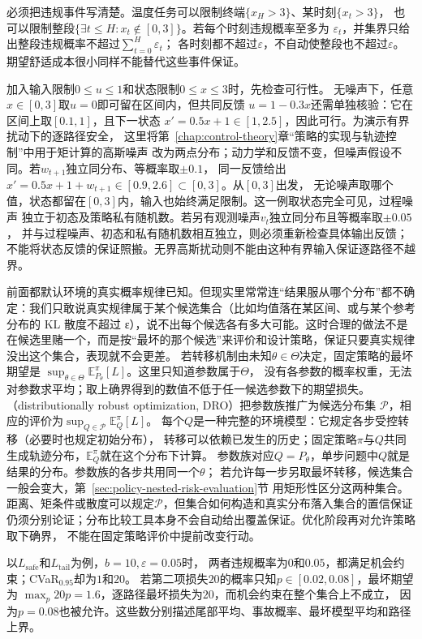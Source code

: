 必须把违规事件写清楚。温度任务可以限制终端$\{x_H>3\}$、某时刻$\{x_t>3\}$，
也可以限制整段$\{\exists t\leq H:x_t\notin[0,3]\}$。若每个时刻违规概率至多为
$\varepsilon_t$，并集界只给出整段违规概率不超过$\sum_{t=0}^H\varepsilon_t$；
各时刻都不超过$\varepsilon$，不自动使整段也不超过$\varepsilon$。
期望舒适成本很小同样不能替代这些事件保证。

加入输入限制$0\leq u\leq1$和状态限制$0\leq x\leq3$时，先检查可行性。
无噪声下，任意$x\in[0,3]$取$u=0$即可留在区间内，但共同反馈
$u=1-0.3x$还需单独核验：它在区间上取$[0.1,1]$，且下一状态
$x'=0.5x+1\in[1,2.5]$，因此可行。为演示有界扰动下的逐路径安全，
这里将第~\ref{chap:control-theory}章“策略的实现与轨迹控制”中用于矩计算的高斯噪声
改为两点分布；动力学和反馈不变，但噪声假设不同。若$w_{t+1}$独立同分布、等概率取$\pm0.1$，
同一反馈给出$x'=0.5x+1+w_{t+1}\in[0.9,2.6]\subset[0,3]$。从$[0,3]$出发，
无论噪声取哪个值，状态都留在$[0,3]$内，输入也始终满足限制。这一例取状态完全可见，过程噪声
独立于初态及策略私有随机数。若另有观测噪声$v_t$独立同分布且等概率取$\pm0.05$，
并与过程噪声、初态和私有随机数相互独立，则必须重新检查具体输出反馈；
不能将状态反馈的保证照搬。无界高斯扰动则不能由这种有界输入保证逐路径不越界。

前面都默认环境的真实概率规律已知。但现实里常常连“结果服从哪个分布”都不确定：我们只敢说真实规律属于某个候选集合（比如均值落在某区间、或与某个参考分布的 KL 散度不超过 ε），说不出每个候选各有多大可能。这时合理的做法不是在候选里赌一个，而是按“最坏的那个候选”来评价和设计策略，保证只要真实规律没出这个集合，表现就不会更差。
若转移机制由未知$\theta\in\Theta$决定，固定策略的最坏期望是
$\sup_{\theta\in\Theta}\mathbb E^\pi_{P_\theta}[L]$。这里只知道参数属于$\Theta$，
没有各参数的概率权重，无法对参数求平均；取上确界得到的数值不低于任一候选参数下的期望损失。
（distributionally robust optimization, DRO）把参数族推广为候选分布集
$\mathcal P$，相应的评价为$\sup_{Q\in\mathcal P}\mathbb E^\pi_Q[L]$。
每个$Q$是一种完整的环境模型：它规定各步受控转移（必要时也规定初始分布），
转移可以依赖已发生的历史；固定策略$\pi$与$Q$共同生成轨迹分布，$\mathbb E^\pi_Q$就在这个分布下计算。
参数族对应$Q=P_\theta$，单步问题中$Q$就是结果的分布。参数族的各步共用同一个$\theta$；
若允许每一步另取最坏转移，候选集合一般会变大，第~\ref{sec:policy-nested-risk-evaluation}节
用矩形性区分这两种集合。
距离、矩条件或散度可以规定$\mathcal P$，但集合如何构造和真实分布落入集合的置信保证
仍须分别论证；分布比较工具本身不会自动给出覆盖保证。优化阶段再对允许策略取下确界，
不能在固定策略评价中提前改变行动。

以$L_{\mathrm{safe}}$和$L_{\mathrm{tail}}$为例，$b=10,\varepsilon=0.05$时，
两者违规概率为$0$和$0.05$，都满足机会约束；CVaR$_{0.95}$却为$1$和$20$。
若第二项损失$20$的概率只知$p\in[0.02,0.08]$，最坏期望为
$\max_p20p=1.6$，逐路径最坏损失为$20$，而机会约束在整个集合上不成立，
因为$p=0.08$也被允许。这些数分别描述尾部平均、事故概率、最坏模型平均和路径上界。

